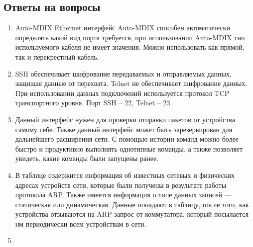 \documentclass[a4paper,14pt]{extarticle}
\begin{document}
\subsection*{Ответы на вопросы}
\begin{enumerate}
	\item Auto-MDIX
	Ethernet интерфейс Auto-MDIX способен автоматически определять какой вид порта требуется, при использовании Auto-MDIX тип используемого кабеля не имеет значения. Можно использовать как прямой, так и перекрестный кабель.
	
	\item SSH обеспечивает шифрование передаваемых и отправляемых данных, защищая данные от перехвата. Telnet не обеспечивает шифрование данных. При использовании данных подключений используется протокол TCP транспортного уровня. Порт SSH -- 22, Telnet -- 23.
	\item Данный интерфейс нужен для проверки отправки пакетов от устройства самому себе. Также данный интерфейс может быть зарезервирован для дальнейшего расширения сети. С помощью истории команд можно более быстро и продуктивно выполнять однотипные команды, а также позволяет увидеть, какие команды были запущены ранее. 
	\item В таблице содержится информация об известных сетевых и физических адресах устройств сети, которые были получены в результате работы протокола ARP. Также имеется информация о типе данных записей --- статическая или динамическая. Данные попадают в таблицу, после того, как устройства отзываются на ARP запрос от коммутатора, который посылается им периодически всем устройствам в сети.
	\item 
\end{enumerate}
\end{document}
